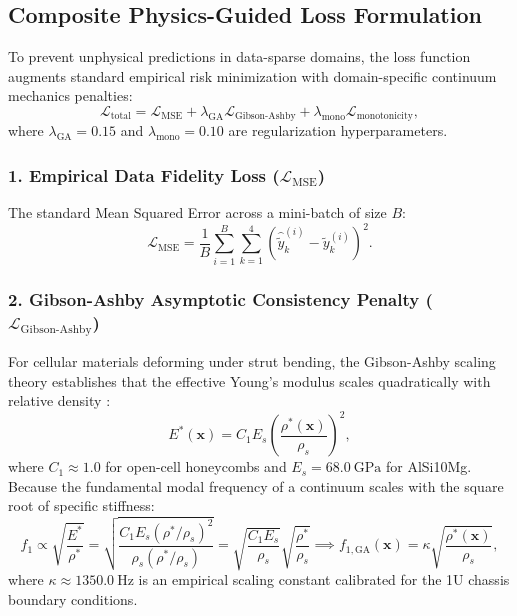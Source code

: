 \subsection{Composite Physics-Guided Loss Formulation}

To prevent unphysical predictions in data-sparse domains, the loss function augments standard empirical risk minimization with domain-specific continuum mechanics penalties:
\begin{equation}
\mathcal{L}_{\text{total}} = \mathcal{L}_{\text{MSE}} + \lambda_{\text{GA}} \mathcal{L}_{\text{Gibson-Ashby}} + \lambda_{\text{mono}} \mathcal{L}_{\text{monotonicity}},
\label{eq:total_physics_loss}
\end{equation}
where $\lambda_{\text{GA}} = 0.15$ and $\lambda_{\text{mono}} = 0.10$ are regularization hyperparameters.

\subsubsection{1. Empirical Data Fidelity Loss ($\mathcal{L}_{\text{MSE}}$)}
The standard Mean Squared Error across a mini-batch of size $B$:
\begin{equation}
\mathcal{L}_{\text{MSE}} = \frac{1}{B} \sum_{i=1}^B \sum_{k=1}^4 \left( \hat{\tilde{y}}_k^{(i)} - \tilde{y}_k^{(i)} \right)^2.
\label{eq:loss_mse}
\end{equation}

\subsubsection{2. Gibson-Ashby Asymptotic Consistency Penalty ($\mathcal{L}_{\text{Gibson-Ashby}}$)}
For cellular materials deforming under strut bending, the Gibson-Ashby scaling theory establishes that the effective Young's modulus scales quadratically with relative density \cite{gibson1997,beigrezaee2026}:
\begin{equation}
E^*(\mathbf{x}) = C_1 E_s \left(\frac{\rho^*(\mathbf{x})}{\rho_s}\right)^2,
\label{eq:ga_modulus}
\end{equation}
where $C_1 \approx 1.0$ for open-cell honeycombs and $E_s = \SI{68.0}{\giga\pascal}$ for AlSi10Mg. Because the fundamental modal frequency of a continuum scales with the square root of specific stiffness:
\begin{equation}
f_1 \propto \sqrt{\frac{E^*}{\rho^*}} = \sqrt{\frac{C_1 E_s (\rho^*/\rho_s)^2}{\rho_s (\rho^*/\rho_s)}} = \sqrt{\frac{C_1 E_s}{\rho_s}} \sqrt{\frac{\rho^*}{\rho_s}} \implies f_{1,\text{GA}}(\mathbf{x}) = \kappa \sqrt{\frac{\rho^*(\mathbf{x})}{\rho_s}},
\label{eq:ga_freq_scaling}
\end{equation}
where $\kappa \approx \SI{1350.0}{\hertz}$ is an empirical scaling constant calibrated for the 1U chassis boundary conditions.

